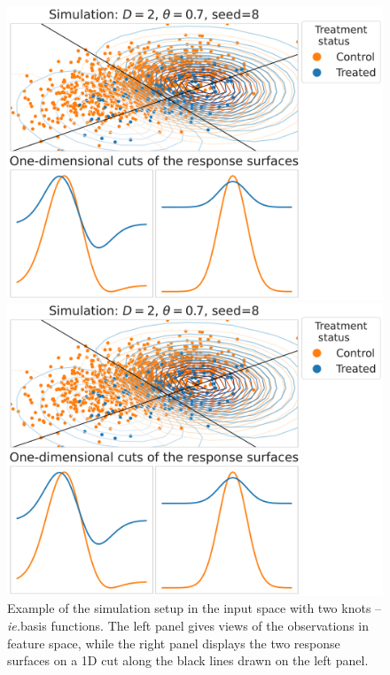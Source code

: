 \documentclass[10pt]{article}
\begin{document}
\begin{multicols}{2}
    \begin{figure}[!t]
        \begin{minipage}{0.48\linewidth}
            \centering
            \includegraphics[width=0.98\linewidth,clip,trim={0 15.3cm 0 0}]{images/caussim_example_rs_gaussian=8_rs_rotation=8_ntv=0.37_D=2_overlap=0.7_p_A=0.1.pdf}
        \end{minipage}
        \hfill
        \begin{minipage}{0.48\linewidth}
            \hfill%
            \includegraphics[width=0.98\linewidth,clip,trim={0 0 0 17cm}]{images/caussim_example_rs_gaussian=8_rs_rotation=8_ntv=0.37_D=2_overlap=0.7_p_A=0.1.pdf}
        \end{minipage}
        \caption{Example of the simulation setup in the input space with two
            knots --\emph{ie.}basis functions. The left panel gives
            views of the observations in feature space, while the right panel displays the
            two response surfaces on a 1D cut along the black lines drawn on
            the left panel.}
        \label{fig:simulation_examples}
    \end{figure}



\end{multicols}
\end{document}
